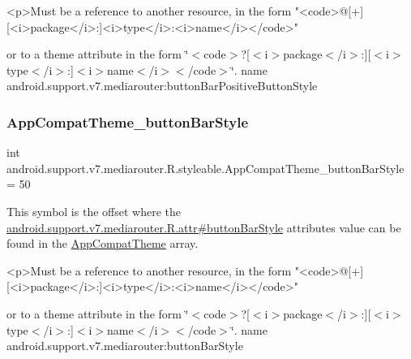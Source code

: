 \begin{DoxyVerb}      <p>Must be a reference to another resource, in the form "<code>@[+][<i>package</i>:]<i>type</i>:<i>name</i></code>"
\end{DoxyVerb}
 or to a theme attribute in the form \char`\"{}$<$code$>$?\mbox{[}$<$i$>$package$<$/i$>$\+:\mbox{]}\mbox{[}$<$i$>$type$<$/i$>$\+:\mbox{]}$<$i$>$name$<$/i$>$$<$/code$>$\char`\"{}.  name android.\+support.\+v7.\+mediarouter\+:button\+Bar\+Positive\+Button\+Style \mbox{\label{classandroid_1_1support_1_1v7_1_1mediarouter_1_1R_1_1styleable_af5a3bc9fc8ba28ff915f6087ef908076}} 
\subsubsection{\texorpdfstring{App\+Compat\+Theme\+\_\+button\+Bar\+Style}{AppCompatTheme\_buttonBarStyle}}
{\footnotesize\ttfamily int android.\+support.\+v7.\+mediarouter.\+R.\+styleable.\+App\+Compat\+Theme\+\_\+button\+Bar\+Style = 50\hspace{0.3cm}{\ttfamily [static]}}

This symbol is the offset where the \hyperlink{classandroid_1_1support_1_1v7_1_1mediarouter_1_1R_1_1attr_a73eefc7ed30df5194afb425fc18de5cf}{android.\+support.\+v7.\+mediarouter.\+R.\+attr\#button\+Bar\+Style} attribute\textquotesingle{}s value can be found in the \hyperlink{classandroid_1_1support_1_1v7_1_1mediarouter_1_1R_1_1styleable_a4e3d3900c75d49aeb2f283cac00214d6}{App\+Compat\+Theme} array.

\begin{DoxyVerb}      <p>Must be a reference to another resource, in the form "<code>@[+][<i>package</i>:]<i>type</i>:<i>name</i></code>"
\end{DoxyVerb}
 or to a theme attribute in the form \char`\"{}$<$code$>$?\mbox{[}$<$i$>$package$<$/i$>$\+:\mbox{]}\mbox{[}$<$i$>$type$<$/i$>$\+:\mbox{]}$<$i$>$name$<$/i$>$$<$/code$>$\char`\"{}.  name android.\+support.\+v7.\+mediarouter\+:button\+Bar\+Style \mbox{\label{classandroid_1_1support_1_1v7_1_1mediarouter_1_1R_1_1styleable_ad16bbba5da5476638832d9e2a54b7abe}} 
